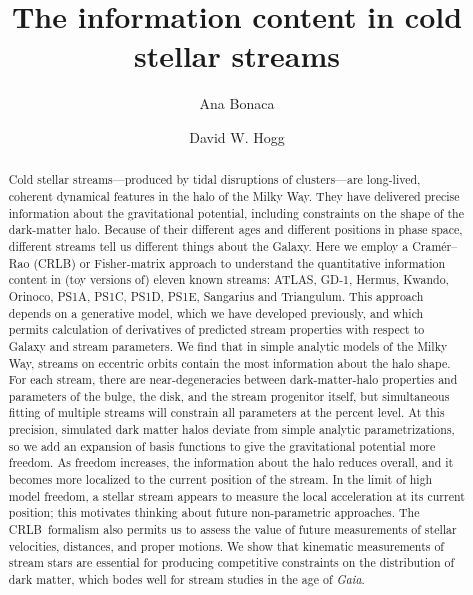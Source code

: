 \documentclass[modern]{aastex61}
\newcommand{\acronym}[1]{{\small{#1}}}
\newcommand{\CRLB}{\acronym{CRLB}}
\begin{document}
\sloppy\sloppypar\raggedbottom\frenchspacing %

\title{The information content in cold stellar streams}


\author[0000-0002-7846-9787]{Ana Bonaca}

\author[0000-0003-2866-9403]{David W. Hogg}

\begin{abstract}\noindent %
Cold stellar streams---produced by tidal disruptions of clusters---are long-lived, coherent dynamical features in the halo of the Milky Way.
They have delivered precise information about the gravitational potential, including constraints on the shape of the dark-matter halo.
Because of their different ages and different positions in phase space, different streams tell us different things about the Galaxy.
Here we employ a Cram\'er--Rao (\CRLB) or Fisher-matrix approach to understand the quantitative information content in (toy versions of) eleven known streams: ATLAS, GD-1, Hermus, Kwando, Orinoco, PS1A, PS1C, PS1D, PS1E, Sangarius and Triangulum.
This approach depends on a generative model, which we have developed previously, and which permits calculation of derivatives of predicted stream properties with respect to Galaxy and stream parameters.
We find that in simple analytic models of the Milky Way, streams on eccentric orbits contain the most information about the halo shape.
For each stream, there are near-degeneracies between dark-matter-halo properties and parameters of the bulge, the disk, and the stream progenitor itself, but simultaneous fitting of multiple streams will constrain all parameters at the percent level.
At this precision, simulated dark matter halos deviate from simple analytic parametrizations, so we add an expansion of basis functions to give the gravitational potential more freedom.
As freedom increases, the information about the halo reduces overall, and it becomes more localized to the current position of the stream.
In the limit of high model freedom, a stellar stream appears to measure the local acceleration at its current position; this motivates thinking about future non-parametric approaches.
The \CRLB\ formalism also permits us to assess the value of future measurements of stellar velocities, distances, and proper motions.
We show that kinematic measurements of stream stars are essential for producing competitive constraints on the distribution of dark matter, which bodes well for stream studies in the age of \textsl{Gaia}.
\end{abstract}
\end{document}
